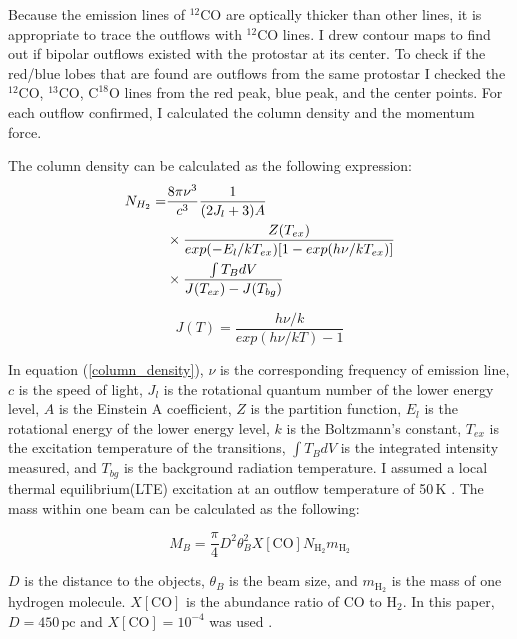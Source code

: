 Because the emission lines of $^{12}$CO are optically thicker than other lines, it is appropriate to trace the outflows with $^{12}$CO lines. I drew contour maps to find out if bipolar outflows existed with the protostar at its center. To check if the red/blue lobes that are found are outflows from the same protostar I checked the $^{12}$CO, $^{13}$CO, $\textrm{C}^{18}\textrm{O}$ lines from the red peak, blue peak, and the center points. For each outflow confirmed, I calculated the column density and the momentum force.

The column density can be calculated as the following expression:
\begin{align}
	N_{H_2} =& \frac{8\pi \nu^3}{c^3} \frac{1}{(2J_l +3)A}  \notag \\
	& \times \frac{Z(T_{ex})}{exp(-E_l / kT_{ex})[1-exp(h\nu / kT_{ex})]} \notag \\
	& \times \frac{\int T_B dV}{J(T_{ex})-J(T_{bg})} \label{column_density}
\end{align}

\begin{equation}
J(T) = \frac{h \nu / k}{exp(h\nu / kT)-1}
\end{equation}

In equation (\ref{column_density}), $\nu$ is the corresponding frequency of emission line, $c$ is the speed of light, $J_l$ is the rotational quantum number of the lower energy level, $A$ is the Einstein A coefficient, $Z$ is the partition function, $E_l$ is the rotational energy of the lower energy level, $k$ is the Boltzmann's constant, $T_{ex}$ is the excitation temperature of the transitions, $\int T_B dV$ is the integrated intensity measured, and $T_{bg}$ is the background radiation temperature. I assumed a local thermal equilibrium(LTE) excitation at an outflow temperature of 50$\,$K \cite{takahashi2008millimeter}.
The mass within one beam can be calculated as the following:

\begin{equation}
M_B =  \frac{\pi}{4} D^2 \theta_B ^2 X[\textrm{CO}] N_{\textrm{H}_2} m_{\textrm{H}_2} \label{beam_mass}
\end{equation}

$D$ is the distance to the objects, $\theta_B$ is the beam size, and $m_{\textrm{H}_2}$ is the mass of one hydrogen molecule. $X[\textrm{CO}]$ is the abundance ratio of CO to $\textrm{H}_2$. In this paper, $D = 450\,\textrm{pc}$ and $X[\textrm{CO}] = 10^{-4}$ was used \cite{hatchell2007star}.\\

